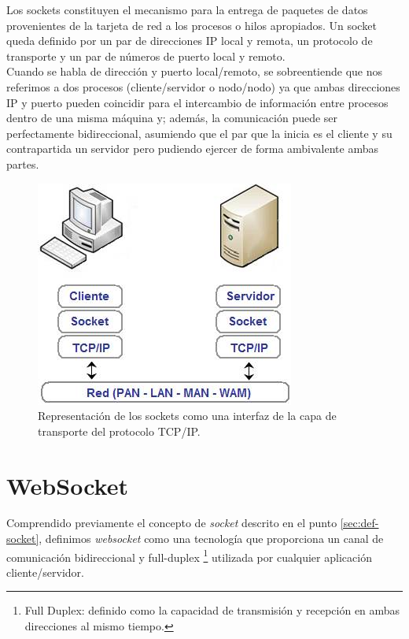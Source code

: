 Los sockets constituyen el mecanismo para la entrega de paquetes de datos provenientes de la tarjeta de red a los procesos o hilos apropiados. Un socket queda definido por un par de direcciones IP local
y remota, un protocolo de transporte y un par de números de puerto local y remoto.\\

Cuando se habla de dirección y puerto local/remoto, se sobreentiende que nos referimos a dos procesos (cliente/servidor o nodo/nodo) ya que ambas direcciones IP y puerto pueden coincidir para el intercambio de información entre procesos dentro de una misma máquina
y; además, la comunicación puede ser perfectamente bidireccional, asumiendo que el par que la inicia es el cliente y su contrapartida un servidor pero pudiendo ejercer de forma ambivalente ambas partes.\\


\begin{figure}[H]
  \begin{center}
    \includegraphics[scale=0.8]{imagenes/comunicaciones/socket.jpg}
  \end{center}
  \caption{ Representación de los sockets como una interfaz de la capa de transporte del protocolo TCP/IP.}
  \label{diagram:socket}
\end{figure}


\section{WebSocket}
\label{sec:def-websocket}

Comprendido previamente el concepto de \emph{socket} descrito en el punto \ref{sec:def-socket}, definimos  \emph{websocket} como una tecnología que proporciona un canal de comunicación bidireccional y full-duplex 
\footnote{Full Duplex: definido como la capacidad de transmisión y recepción en ambas direcciones al mismo tiempo. } utilizada por cualquier aplicación cliente/servidor.\\


